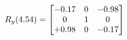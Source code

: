 \documentclass[preview]{standalone}
\begin{document}
\begin{align*}
\special{dvisvgm:raw <g id='unique000'>}R_{y}(4.54) = \begin{bmatrix}-0.17 & 0 & -0.98 \\0 & 1 & 0 \\+0.98 & 0 & -0.17\end{bmatrix}\special{dvisvgm:raw </g>}
\end{align*}
\end{document}
